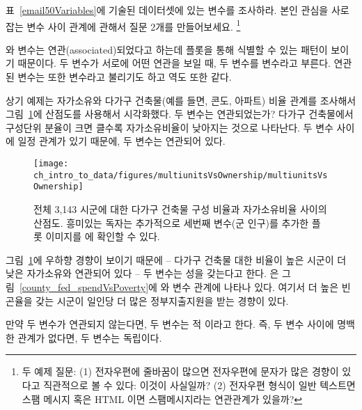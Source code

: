 \begin{exercise}
표~\vref{email50Variables}에 기술된  데이터셋에 있는 변수를 조사하라.
본인 관심을 사로잡는 변수 사이 관계에 관해서 질문 2개를 만들어보세요.
\footnote{두 예제 질문: (1) 전자우편에 줄바꿈이 많으면 전자우편에 문자가 많은 경향이 있다고 직관적으로 볼 수 있다: 이것이 사실일까? (2) 전자우편 형식이 일반 텍스트면 스팸 메시지 혹은 HTML 이면 스팸메시지라는 연관관계가 있을까?}
\end{exercise}

 와  변수는 연관(associated)되었다고 하는데 플롯을 통해 식별할 수 있는 패턴이 보이기 때문이다. 두 변수가 서로에 어떤 연관을 보일 때, 두 변수를  변수라고 부른다. 연관된 변수는 또한  변수라고 불리기도 하고 역도 또한 같다.


\begin{example}{상기 예제는 자가소유와 다가구 건축물(예를 들면, 콘도, 아파트) 비율 관계를 조사해서 
그림~\ref{multiunitsVsOwnership}에 산점도를 사용해서 시각화했다. 두 변수는 연관되었는가?}
다가구 건축물에서 구성단위 분율이 크면 클수록 자가소유비율이 낮아지는 것으로 나타난다.
두 변수 사이에 일정 관계가 있기 때문에, 두 변수는 연관되어 있다.
\end{example}


\begin{figure}
   \centering
   \texttt{[image: ch\_intro\_to\_data/figures/multiunitsVsOwnership/multiunitsVsOwnership]}
   \caption{전체 3,143 시군에 대한 다가구 건축물 구성 비율과 자가소유비율 사이의 산점도.
   흥미있는 독자는 추가적으로 세번째 변수(군 인구)를 추가한 플롯 이미지를 에 확인할 수 있다.}
   \label{multiunitsVsOwnership}
\end{figure}

그림~\ref{multiunitsVsOwnership}에 우하향 경향이 보이기 때문에 -- 다가구 건축물 대한 비율이 높은 시군이 더 낮은 자가소유와 연관되어 있다 -- 두 변수는 성을 갖는다고 한다. 
은 그림~\ref{county_fed_spendVsPoverty}에   와  변수 관계에 나타나 있다.  여기서 더 높은 빈곤율을 갖는 시군이 일인당 더 많은 정부지출지원을 받는 경향이 있다.

만약 두 변수가 연관되지 않는다면, 두 변수는 적 이라고 한다.
즉, 두 변수 사이에 명백한 관계가 없다면, 두 변수는 독립이다.

